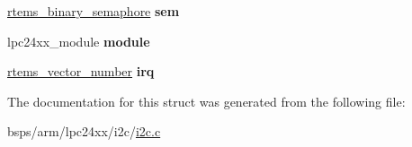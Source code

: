 \begin{DoxyCompactItemize}
\mbox{\label{structlpc24xx__i2c__bus_a97b78d78de9b6b5a8a632245bcd25a89}} 
\mbox{\hyperlink{structrtems__binary__semaphore}{rtems\+\_\+binary\+\_\+semaphore}} {\bfseries sem}
\item 
\mbox{\label{structlpc24xx__i2c__bus_aea59aafdce3b048327e87c45fdfaf77e}} 
lpc24xx\+\_\+module {\bfseries module}
\item 
\mbox{\label{structlpc24xx__i2c__bus_ac9cc490f43bbec401562cdd63fb4352a}} 
\mbox{\hyperlink{group__ClassicINTR_ga3e434c197d99f128e78cae4d9358bd8b}{rtems\+\_\+vector\+\_\+number}} {\bfseries irq}
\end{DoxyCompactItemize}


The documentation for this struct was generated from the following file\+:\begin{DoxyCompactItemize}
\item 
bsps/arm/lpc24xx/i2c/\mbox{\hyperlink{arm_2lpc24xx_2i2c_2i2c_8c}{i2c.\+c}}\end{DoxyCompactItemize}
